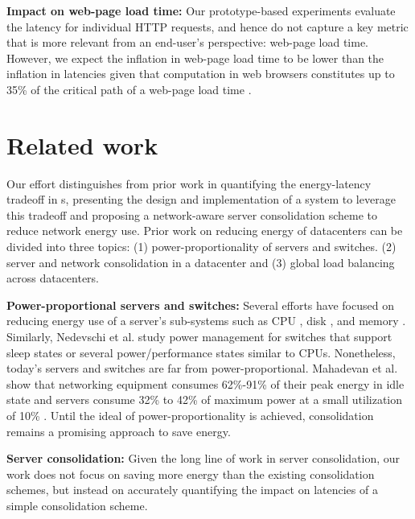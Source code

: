 \textbf{Impact on web-page load time:} Our prototype-based experiments evaluate the latency for individual HTTP requests, and hence do not capture a key metric that is more relevant from an end-user's perspective: web-page load time. However, we expect the inflation in web-page load time to be lower than the inflation in latencies given that computation in web browsers constitutes up to 35\% of the critical path of a web-page load time \cite{wprof}.



\section{Related work}

Our effort distinguishes from prior work in quantifying the energy-latency tradeoff  in \cdc s, presenting the design and implementation of a system to leverage this tradeoff and proposing a network-aware server consolidation scheme to reduce network energy use.  Prior work on reducing energy of datacenters can be divided into three topics: (1) power-proportionality of servers and switches.  (2) server and network consolidation in a datacenter and (3) global load balancing across datacenters.

\textbf{Power-proportional servers and switches:}  Several efforts have focused on reducing energy use of a server's sub-systems such as CPU \cite{dvfs}, disk \cite{lu1999adaptive}, and memory \cite{fan2001memory}. Similarly, Nedevschi et al. \cite{Nedevschi08} study power management for switches that support sleep states or several power/performance states similar to CPUs. Nonetheless, today's servers and switches are far from power-proportional. Mahadevan et al. show that networking equipment consumes 62\%-91\% of their peak energy in idle state \cite{mahadevan2009power} and servers consume 32\% to 42\% of maximum power at a small utilization of 10\% \cite{spec}. Until the ideal of power-proportionality is achieved, consolidation remains a promising approach to save energy.

\textbf{Server consolidation:} Given the long line of work in server consolidation, our work does not focus on saving more energy than the existing consolidation schemes, but instead on accurately quantifying the impact on latencies of a simple consolidation scheme.


